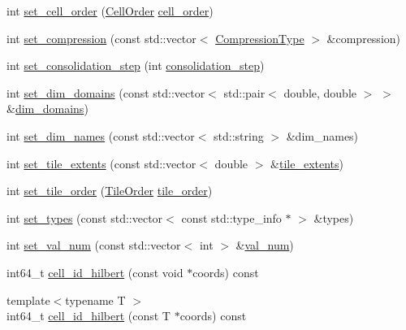 \begin{DoxyCompactItemize}
\item 
int \hyperlink{classArraySchema_a0d19b100e70cf35aff32a72a129dbcc1}{set\+\_\+cell\+\_\+order} (\hyperlink{classArraySchema_a847601130253f905337b5e284e1b78f2}{Cell\+Order} \hyperlink{classArraySchema_a15bc4e7fb776028c9705f38218eac785}{cell\+\_\+order})
\item 
int \hyperlink{classArraySchema_a4cd17bb25532731f55465d0a702cd75c}{set\+\_\+compression} (const std\+::vector$<$ \hyperlink{classArraySchema_a167615fb84dd6124ab2dac0dbbf35d46}{Compression\+Type} $>$ \&compression)
\item 
int \hyperlink{classArraySchema_a257e06fc70e9f7fc2832c7185ab7a4cc}{set\+\_\+consolidation\+\_\+step} (int \hyperlink{classArraySchema_ac60045afe56673ac365ecb754efd042f}{consolidation\+\_\+step})
\item 
int \hyperlink{classArraySchema_a77b9aa769658e06556d854e799ffb06a}{set\+\_\+dim\+\_\+domains} (const std\+::vector$<$ std\+::pair$<$ double, double $>$ $>$ \&\hyperlink{classArraySchema_a7b134e05120440e3d4598884a85d92bc}{dim\+\_\+domains})
\item 
int \hyperlink{classArraySchema_a03f55b7f56bf7a75c0b91092e00c708c}{set\+\_\+dim\+\_\+names} (const std\+::vector$<$ std\+::string $>$ \&dim\+\_\+names)
\item 
int \hyperlink{classArraySchema_aa2ec71a0be165e70c56f02720fb27af9}{set\+\_\+tile\+\_\+extents} (const std\+::vector$<$ double $>$ \&\hyperlink{classArraySchema_a8bb97e1ed6aa142aa35fa446a413d698}{tile\+\_\+extents})
\item 
int \hyperlink{classArraySchema_aa4ce6d174a1d0e84231ef14e27cdcec9}{set\+\_\+tile\+\_\+order} (\hyperlink{classArraySchema_ae9240847f83a545b7de651f032ffde63}{Tile\+Order} \hyperlink{classArraySchema_a644e0d03963cae3528456c9cfd0ad13d}{tile\+\_\+order})
\item 
int \hyperlink{classArraySchema_a75e69bc91e0fc0685eb7280301995b34}{set\+\_\+types} (const std\+::vector$<$ const std\+::type\+\_\+info $\ast$ $>$ \&types)
\item 
int \hyperlink{classArraySchema_a7fe6cf1a5bb7d0321ef5728b3d092770}{set\+\_\+val\+\_\+num} (const std\+::vector$<$ int $>$ \&\hyperlink{classArraySchema_ad9132dbb5ad3c838df5750b3e1c71075}{val\+\_\+num})
\item 
int64\+\_\+t \hyperlink{classArraySchema_ac6cdff730837d2857e02ea0d84e6797a}{cell\+\_\+id\+\_\+hilbert} (const void $\ast$coords) const 
\item 
{\footnotesize template$<$typename T $>$ }\\int64\+\_\+t \hyperlink{classArraySchema_ae0cd386c8a834d1f44e7efe9f15965c4}{cell\+\_\+id\+\_\+hilbert} (const T $\ast$coords) const 

\end{DoxyCompactItemize}
